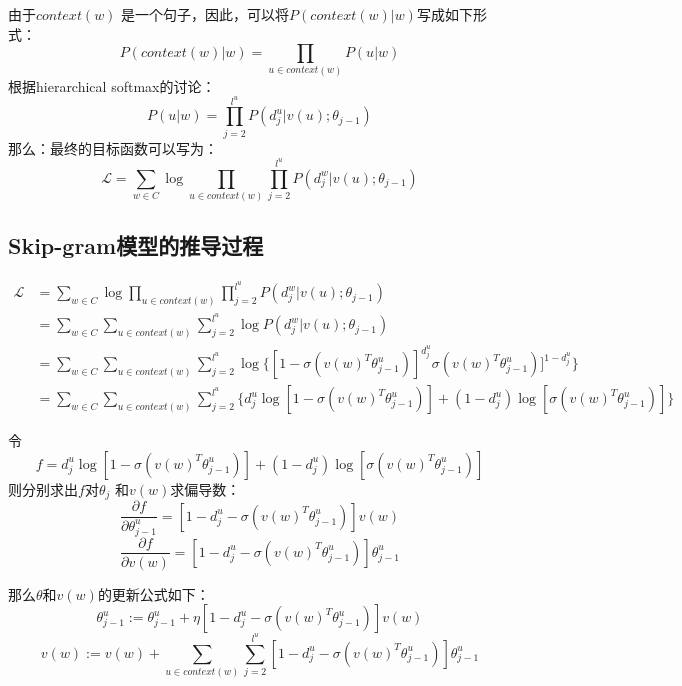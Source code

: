     由于$context(w)$ 是一个句子，因此，可以将$P(context(w)|w)$写成如下形式：
    \begin{equation}
        P(context(w)|w) = \prod_{u \in context(w)}P(u|w)
    \end{equation}
    根据hierarchical softmax的讨论：
    \begin{equation}
        P(u|w) = \prod_{j=2}^{l^u}P(d_j^u|v(u); \theta_{j-1})
    \end{equation}
    那么：最终的目标函数可以写为：
    \begin{equation}
        \mathcal{L} = \sum_{w \in C} \log \prod_{u \in context(w)} \prod_{j=2}^{l^u}P(d_j^w|v(u); \theta_{j-1})
    \end{equation}

    \subsection{Skip-gram模型的推导过程}
    \begin{equation}
        \begin{split}
            \mathcal{L} &= \sum_{w \in C} \log \prod_{u \in context(w)} \prod_{j=2}^{l^u}P(d_j^w|v(u); \theta_{j-1}) \\
            &= \sum_{w \in C}\sum_{u \in context(w)} \sum_{j=2}^{l^u} \log P(d_j^w|v(u); \theta_{j-1})\\
            &= \sum_{w \in C}\sum_{u \in context(w)} \sum_{j=2}^{l^u} \log \{ [1-\sigma(v(w)^T\theta_{j-1}^{u})]^{d_j^u} \sigma(v(w)^T\theta_{j-1}^{u})]^{1-d_j^u} \}\\
            &=\sum_{w \in C}\sum_{u \in context(w)} \sum_{j=2}^{l^u} \{d_j^u\log [1-\sigma(v(w)^T\theta_{j-1}^{u})] + (1-d_j^u)\log [\sigma(v(w)^T\theta_{j-1}^{u})]\}
        \end{split}
    \end{equation}

    令
    \begin{equation}
        f = d_j^u\log [1-\sigma(v(w)^T\theta_{j-1}^{u})] + (1-d_j^u)\log [\sigma(v(w)^T\theta_{j-1}^{u})]
    \end{equation}
    则分别求出$f$对$\theta_j$ 和$v(w)$求偏导数：
    \begin{equation}
        \frac{\partial{f}}{\partial{\theta_{j-1}^{u}}}=[1-d_j^u-\sigma(v(w)^T\theta_{j-1}^{u})] v(w)
    \end{equation}
    \begin{equation}
        \frac{\partial{f}}{\partial{v(w)}} = [1-d_j^u-\sigma(v(w)^T\theta_{j-1}^{u})] \theta_{j-1}^{u}
    \end{equation}

    那么$\theta$和$v(w)$的更新公式如下：
    \begin{equation}
        \theta_{j-1}^{u} :=\theta_{j-1}^{u}+\eta [1-d_j^u-\sigma(v(w)^T\theta_{j-1}^{u})] v(w)
    \end{equation}
    \begin{equation}
        v(w):=v(w)+\sum_{u \in context(w)} \sum_{j=2}^{l^u}[1-d_j^u-\sigma(v(w)^T\theta_{j-1}^{u})] \theta_{j-1}^{u}
    \end{equation}




